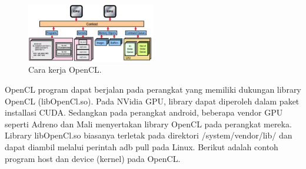 \begin{figure}
	\centering
	\includegraphics[width=0.50\textwidth]
	{pics/opencl-context.png}
	\caption{Cara kerja OpenCL.}
	\label{fig:context}
\end{figure}

OpenCL program dapat berjalan pada perangkat yang memiliki dukungan library OpenCL (libOpenCl.so). Pada NVidia GPU, library dapat diperoleh dalam paket installasi CUDA. Sedangkan pada perangkat android, beberapa vendor GPU seperti Adreno dan Mali menyertakan library OpenCL pada perangkat mereka. Library libOpenCl.so biasanya terletak pada direktori /system/vendor/lib/ dan dapat diambil melalui perintah adb pull pada Linux. Berikut adalah contoh program host dan device (kernel) pada OpenCL.

